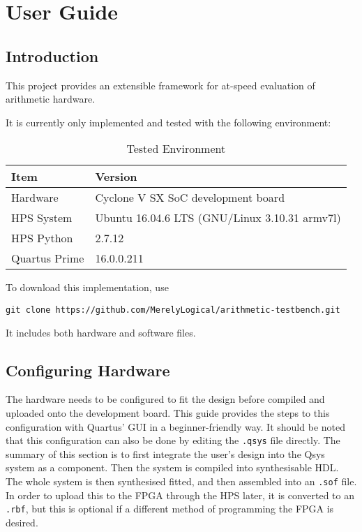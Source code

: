 \chapter{User Guide}
\label{appendix:guide}

\section{Introduction}

This project provides an extensible framework for at-speed evaluation of arithmetic hardware.

It is currently only implemented and tested with the following environment:
\begin{table}[H]
  \centering
  \begin{tabular}{|l|l|}
    \hline
    Item          & Version \\
    \hline
    Hardware      & Cyclone V SX SoC development board \\
    HPS System    & Ubuntu 16.04.6 LTS (GNU/Linux 3.10.31 armv7l)\\
    HPS Python    & 2.7.12 \\
    Quartus Prime & 16.0.0.211 \\
    \hline
  \end{tabular}
  \caption{Tested Environment}
\end{table}

To download this implementation, use

\texttt{git clone https://github.com/MerelyLogical/arithmetic-testbench.git}

It includes both hardware and software files.

\section{Configuring Hardware}
The hardware needs to be configured to fit the design before compiled and uploaded onto the development board.
This guide provides the steps to this configuration with Quartus' GUI in a beginner-friendly way.
It should be noted that this configuration can also be done by editing the \texttt{.qsys} file directly.
The summary of this section is to first integrate the user's design into the Qsys system as a component.
Then the system is compiled into synthesisable HDL.
The whole system is then synthesised fitted, and then assembled into an \texttt{.sof} file.
In order to upload this to the FPGA through the HPS later, it is converted to an \texttt{.rbf}, but this is optional if a different method of programming the FPGA is desired.

